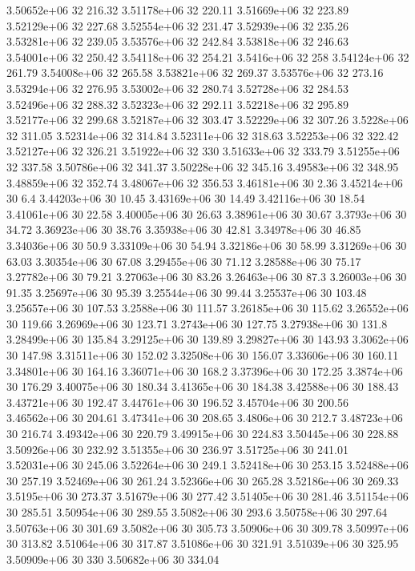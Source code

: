3.50652e+06 32 216.32
3.51178e+06 32 220.11
3.51669e+06 32 223.89
3.52129e+06 32 227.68
3.52554e+06 32 231.47
3.52939e+06 32 235.26
3.53281e+06 32 239.05
3.53576e+06 32 242.84
3.53818e+06 32 246.63
3.54001e+06 32 250.42
3.54118e+06 32 254.21
3.5416e+06 32 258
3.54124e+06 32 261.79
3.54008e+06 32 265.58
3.53821e+06 32 269.37
3.53576e+06 32 273.16
3.53294e+06 32 276.95
3.53002e+06 32 280.74
3.52728e+06 32 284.53
3.52496e+06 32 288.32
3.52323e+06 32 292.11
3.52218e+06 32 295.89
3.52177e+06 32 299.68
3.52187e+06 32 303.47
3.52229e+06 32 307.26
3.5228e+06 32 311.05
3.52314e+06 32 314.84
3.52311e+06 32 318.63
3.52253e+06 32 322.42
3.52127e+06 32 326.21
3.51922e+06 32 330
3.51633e+06 32 333.79
3.51255e+06 32 337.58
3.50786e+06 32 341.37
3.50228e+06 32 345.16
3.49583e+06 32 348.95
3.48859e+06 32 352.74
3.48067e+06 32 356.53
3.46181e+06 30 2.36
3.45214e+06 30 6.4
3.44203e+06 30 10.45
3.43169e+06 30 14.49
3.42116e+06 30 18.54
3.41061e+06 30 22.58
3.40005e+06 30 26.63
3.38961e+06 30 30.67
3.3793e+06 30 34.72
3.36923e+06 30 38.76
3.35938e+06 30 42.81
3.34978e+06 30 46.85
3.34036e+06 30 50.9
3.33109e+06 30 54.94
3.32186e+06 30 58.99
3.31269e+06 30 63.03
3.30354e+06 30 67.08
3.29455e+06 30 71.12
3.28588e+06 30 75.17
3.27782e+06 30 79.21
3.27063e+06 30 83.26
3.26463e+06 30 87.3
3.26003e+06 30 91.35
3.25697e+06 30 95.39
3.25544e+06 30 99.44
3.25537e+06 30 103.48
3.25657e+06 30 107.53
3.2588e+06 30 111.57
3.26185e+06 30 115.62
3.26552e+06 30 119.66
3.26969e+06 30 123.71
3.2743e+06 30 127.75
3.27938e+06 30 131.8
3.28499e+06 30 135.84
3.29125e+06 30 139.89
3.29827e+06 30 143.93
3.3062e+06 30 147.98
3.31511e+06 30 152.02
3.32508e+06 30 156.07
3.33606e+06 30 160.11
3.34801e+06 30 164.16
3.36071e+06 30 168.2
3.37396e+06 30 172.25
3.3874e+06 30 176.29
3.40075e+06 30 180.34
3.41365e+06 30 184.38
3.42588e+06 30 188.43
3.43721e+06 30 192.47
3.44761e+06 30 196.52
3.45704e+06 30 200.56
3.46562e+06 30 204.61
3.47341e+06 30 208.65
3.4806e+06 30 212.7
3.48723e+06 30 216.74
3.49342e+06 30 220.79
3.49915e+06 30 224.83
3.50445e+06 30 228.88
3.50926e+06 30 232.92
3.51355e+06 30 236.97
3.51725e+06 30 241.01
3.52031e+06 30 245.06
3.52264e+06 30 249.1
3.52418e+06 30 253.15
3.52488e+06 30 257.19
3.52469e+06 30 261.24
3.52366e+06 30 265.28
3.52186e+06 30 269.33
3.5195e+06 30 273.37
3.51679e+06 30 277.42
3.51405e+06 30 281.46
3.51154e+06 30 285.51
3.50954e+06 30 289.55
3.5082e+06 30 293.6
3.50758e+06 30 297.64
3.50763e+06 30 301.69
3.5082e+06 30 305.73
3.50906e+06 30 309.78
3.50997e+06 30 313.82
3.51064e+06 30 317.87
3.51086e+06 30 321.91
3.51039e+06 30 325.95
3.50909e+06 30 330
3.50682e+06 30 334.04
